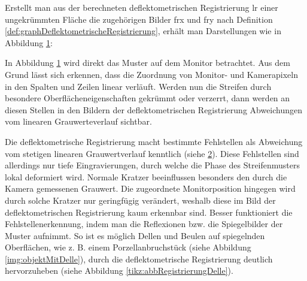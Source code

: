 \p
Erstellt man aus der berechneten deflektometrischen Registrierung \acrshort{lr} einer ungekrümmten Fläche die zugehörigen Bilder \acrshort{frx} und \acrshort{fry} nach Definition \ref{def:graphDeflektometrischeRegistrierung}, erhält man Darstellungen wie in Abbildung \ref{tikz:abbOptimaleSpaltenZeilenReg}:

{
	\begin{figure}[H]
		\centering
		
		\label{tikz:abbOptimaleSpaltenZeilenReg}
	\end{figure}
}

\noindent
In Abbildung \ref{tikz:abbOptimaleSpaltenZeilenReg} wird direkt das Muster auf dem Monitor betrachtet.
Aus dem Grund lässt sich erkennen, dass die Zuordnung von Monitor- und Kamerapixeln in den Spalten und Zeilen linear verläuft.
Werden nun die Streifen durch besondere Oberflächeneigenschaften gekrümmt oder verzerrt, dann werden an diesen Stellen in den Bildern der deflektometrischen Registrierung Abweichungen vom linearen Grauwerteverlauf sichtbar.

{
	\begin{figure}[H]
		\centering
		
		\label{tikz:abbBrillenglasRegistrierung}
	\end{figure}
}

\noindent
Die deflektometrische Registrierung macht bestimmte Fehlstellen als Abweichung vom stetigen linearen Grauwertverlauf kenntlich (siehe \ref{tikz:abbBrillenglasRegistrierung}).
Diese Fehlstellen sind allerdings nur tiefe Eingravierungen, durch welche die Phase des Streifenmusters lokal deformiert wird.
Normale Kratzer beeinflussen besonders den durch die Kamera gemessenen Grauwert.
Die zugeordnete Monitorposition hingegen wird durch solche Kratzer nur geringfügig verändert, weshalb diese im Bild der deflektometrischen Registrierung kaum erkennbar sind.
Besser funktioniert die Fehlstellenerkennung, indem man die Reflexionen bzw. die Spiegelbilder der Muster aufnimmt.
So ist es möglich Dellen und Beulen auf spiegelnden Oberflächen, wie z. B. einem Porzellanbruchstück (siehe Abbildung \ref{img:objektMitDelle}), durch die deflektometrische Registrierung deutlich hervorzuheben (siehe Abbildung \ref{tikz:abbRegistrierungDelle}).

